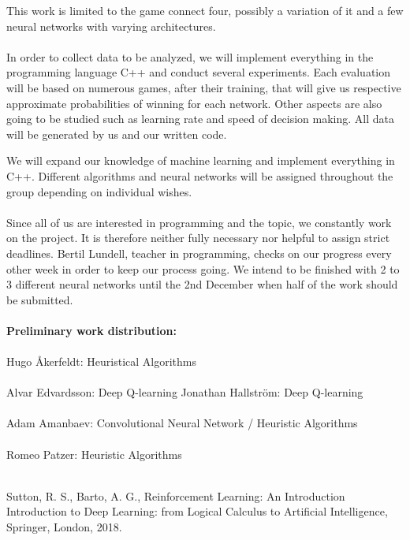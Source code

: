 \documentclass[titlepage]{article}
\begin{document}
This work is limited to the game connect four, possibly a variation of it and a few neural networks with varying architectures. \\\\
In order to collect data to be analyzed, we will implement everything in the programming language C++ and conduct several experiments.
Each evaluation will be based on numerous games, after their training, that will give us respective approximate probabilities of winning for each network.
Other aspects are also going to be studied such as learning rate and speed of decision making.
All data will be generated by us and our written code. 

\newpage
\noindent
We will expand our knowledge of machine learning and implement everything in C++.
Different algorithms and neural networks will be assigned throughout the group depending on individual wishes. \\\\
Since all of us are interested in programming and the topic, we constantly work on the project.
It is therefore neither fully necessary nor helpful to assign strict deadlines.
Bertil Lundell, teacher in programming, checks on our progress every other week in order to keep our process going.
We intend to be finished with 2 to 3 different neural networks until the 2nd December when half of the work should be submitted. \\\\
\textbf{Preliminary work distribution:} \\\\
Hugo Åkerfeldt: Heuristical Algorithms \\\\
Alvar Edvardsson: Deep Q-learning 
Jonathan Hallström: Deep Q-learning \\\\
Adam Amanbaev: Convolutional Neural Network / Heuristic Algorithms \\\\
Romeo Patzer: Heuristic Algorithms \\\\

\begin{thebibliography}{100}
Sutton, R. S., Barto, A. G., Reinforcement Learning: An Introduction
Introduction to Deep Learning: from Logical Calculus to Artificial Intelligence, Springer,
London, 2018.
\end{thebibliography}
\end{document}
